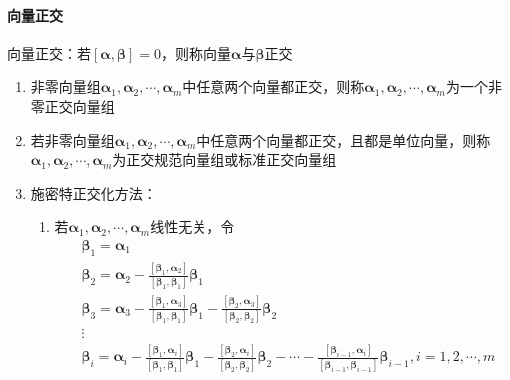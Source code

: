 \documentclass[12pt]{book}
\begin{document}
\paragraph{向量正交}

向量正交：若$[\bm{\alpha},\bm{\beta}]=0$，则称向量$\bm{\alpha}$与$\bm{\beta}$正交


\begin{enumerate}[1.]
    \item 非零向量组$\bm{\alpha}_1,\bm{\alpha}_2,\cdots,\bm{\alpha}_m$中任意两个向量都正交，则称$\bm{\alpha}_1,\bm{\alpha}_2,\cdots,\bm{\alpha}_m$为一个非零正交向量组
    \item 若非零向量组$\bm{\alpha}_1,\bm{\alpha}_2,\cdots,\bm{\alpha}_{m}$中任意两个向量都正交，且都是单位向量，则称$\bm{\alpha}_{1},\bm{\alpha}_{2},\cdots,\bm{\alpha}_{m}$为正交规范向量组或标准正交向量组
    \item 施密特正交化方法：
          \begin{enumerate}[(1)]
              \item 若$\bm{\alpha}_{1},\bm{\alpha}_{2},\cdots,\bm{\alpha}_{m}$线性无关，令
                    \begin{align*}
                        &\bm{\beta}_1 = \bm{\alpha}_1                                                                                                                                                                        \\
                        &\bm{\beta}_2 = \bm{\alpha}_2 - \frac{[\bm{\beta}_{1},\bm{\alpha}_2]}{[\bm{\beta}_1,\bm{\beta}_1]}\bm{\beta}_{1}                                                                                     \\
                        &\bm{\beta}_3 = \bm{\alpha}_3 - \frac{[\bm{\beta}_{1},\bm{\alpha}_3]}{[\bm{\beta}_1,\bm{\beta}_1]}\bm{\beta}_{1} -  \frac{[\bm{\beta}_{2},\bm{\alpha}_3]}{[\bm{\beta}_2,\bm{\beta}_2]}\bm{\beta}_{2} \\
                        &\vdots                                                                                                                                                                                              \\
                        &\bm{\beta}_i = \bm{\alpha}_i - \frac{[\bm{\beta}_{1},\bm{\alpha}_i]}{[\bm{\beta}_1,\bm{\beta}_1]}\bm{\beta}_{1} -  \frac{[\bm{\beta}_{2},\bm{\alpha}_i]}{[\bm{\beta}_2,\bm{\beta}_2]}\bm{\beta}_{2} - \cdots - \frac{[\bm{\beta}_{i-1},\bm{\alpha}_i]}{[\bm{\beta}_{i-1},\bm{\beta}_{i-1}]}\bm{\beta}_{i-1} , i=1,2,\cdots,m

\end{align*}
\end{enumerate}
\end{enumerate}
\end{document}
